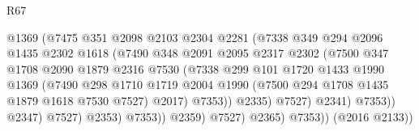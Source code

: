 \begin{lexlean}{R67}
\begin{coremodule}
                                    @1369
                                    (@7475
                                      @351
                                      @2098
                                      @2103
                                      @2304
                                      @2281
                                      (@7338
                                        @349
                                        @294
                                        @2096
                                        @1435
                                        @2302
                                        @1618
                                        (@7490
                                          @348
                                          @2091
                                          @2095
                                          @2317
                                          @2302
                                          (@7500
                                            @347
                                            @1708
                                            @2090
                                            @1879
                                            @2316
                                            @7530
                                            (@7338
                                              @299
                                              @101
                                              @1720
                                              @1433
                                              @1990
                                              @1369
                                              (@7490
                                                @298
                                                @1710
                                                @1719
                                                @2004
                                                @1990
                                                (@7500 @294 @1708 @1435 @1879 @1618 @7530 @7527)
                                                @2017)
                                              @7353))
                                          @2335)
                                        @7527)
                                      @2341)
                                    @7353))
                                @2347)
                              @7527)
                            @2353)
                          @7353))
                      @2359)
                    @7527)
                  @2365)
                @7353))
            (@2016 @2133))

\end{coremodule}
\end{lexlean}
